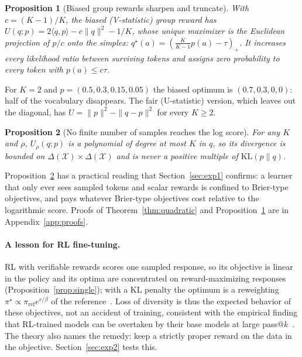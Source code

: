 \documentclass[11pt]{article}
\newtheorem{proposition}{Proposition}
\theoremstyle{definition}
\newcommand{\X}{\mathcal{X}}
\newcommand{\Del}{\Delta(\X)}
\newcommand{\KL}{\mathrm{KL}}
\begin{document}
\begin{proposition}[Biased group rewards sharpen and truncate]\label{prop:vstat}
With $c=(K-1)/K$, the biased (V-statistic) group reward has $U(q;p)=2\langle q,p\rangle-c\|q\|^2-1/K$, whose unique maximizer is the Euclidean projection of $p/c$ onto the simplex: $q^\star(a)=(\tfrac{K}{K-1}p(a)-\tau)_+$. It increases every likelihood ratio between surviving tokens and assigns zero probability to every token with $p(a)\le c\tau$.
\end{proposition}

\noindent For $K=2$ and $p=(0.5,0.3,0.15,0.05)$ the biased optimum is $(0.7,0.3,0,0)$: half of the vocabulary disappears. The fair (U-statistic) version, which leaves out the diagonal, has $U=\|p\|^2-\|q-p\|^2$ for every $K\ge2$.

\begin{proposition}[No finite number of samples reaches the log score]\label{prop:poly}
For any $K$ and $\rho$, $U_\rho(q;p)$ is a polynomial of degree at most $K$ in $q$, so its divergence is bounded on $\Del\times\Del$ and is never a positive multiple of $\KL(p\|q)$.
\end{proposition}

\noindent Proposition~\ref{prop:poly} has a practical reading that Section~\ref{sec:exp1} confirms: a learner that only ever sees sampled tokens and scalar rewards is confined to Brier-type objectives, and pays whatever Brier-type objectives cost relative to the logarithmic score. Proofs of Theorem~\ref{thm:quadratic} and Proposition~\ref{prop:vstat} are in Appendix~\ref{app:proofs}.

\paragraph{A lesson for RL fine-tuning.} RL with verifiable rewards scores one sampled response, so its objective is linear in the policy and its optima are concentrated on reward-maximizing responses (Proposition~\ref{prop:single}); with a KL penalty the optimum is a reweighting $\pi^\star\propto\pi_{\mathrm{ref}}e^{r/\beta}$ of the reference~\cite{korbak2022kl,rafailov2023dpo,gxchen2025kl}. Loss of diversity is thus the expected behavior of these objectives, not an accident of training, consistent with the empirical finding that RL-trained models can be overtaken by their base models at large pass@$k$~\cite{yue2025rlvr}. The theory also names the remedy: keep a strictly proper reward on the data in the objective. Section~\ref{sec:exp2} tests this.
\end{document}
